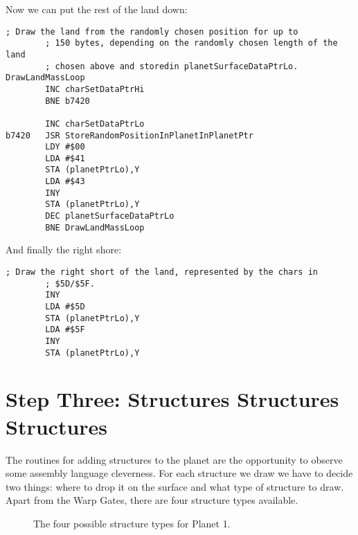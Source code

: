 Now we can put the rest of the land down:


\begin{lstlisting}[caption=Write pairs of \icode{\$41,\$43} for the main land mass.]
        ; Draw the land from the randomly chosen position for up to
        ; 150 bytes, depending on the randomly chosen length of the land
        ; chosen above and storedin planetSurfaceDataPtrLo.
DrawLandMassLoop   
        INC charSetDataPtrHi
        BNE b7420

        INC charSetDataPtrLo
b7420   JSR StoreRandomPositionInPlanetInPlanetPtr
        LDY #$00
        LDA #$41
        STA (planetPtrLo),Y
        LDA #$43
        INY
        STA (planetPtrLo),Y
        DEC planetSurfaceDataPtrLo
        BNE DrawLandMassLoop
\end{lstlisting}

And finally the right shore:

\begin{lstlisting}[caption=Drawing the right hand shore..]
        ; Draw the right short of the land, represented by the chars in
        ; $5D/$5F.
        INY
        LDA #$5D
        STA (planetPtrLo),Y
        LDA #$5F
        INY
        STA (planetPtrLo),Y
\end{lstlisting}


\section{Step Three: Structures Structures Structures}
The routines for adding structures to the planet are the opportunity to observe some assembly language cleverness.
For each structure we draw we have to decide two things: where to drop it on the surface and what type of structure
to draw. Apart from the Warp Gates, there are four structure types available. 

\begin{figure}[H]
  {
    \setlength{\tabcolsep}{3.0pt}
    \setlength\cmidrulewidth{\heavyrulewidth} %
    \begin{adjustbox}{width=15cm,center}
      \begin{subfigure}{0.3\textwidth}
        
      \end{subfigure}
      \begin{subfigure}{0.3\textwidth}
        
      \end{subfigure}
      \begin{subfigure}{0.3\textwidth}
        
      \end{subfigure}
      \begin{subfigure}{0.3\textwidth}
        
      \end{subfigure}
    \end{adjustbox}
  }\caption[]{The four possible structure types for Planet 1.}
\end{figure}


